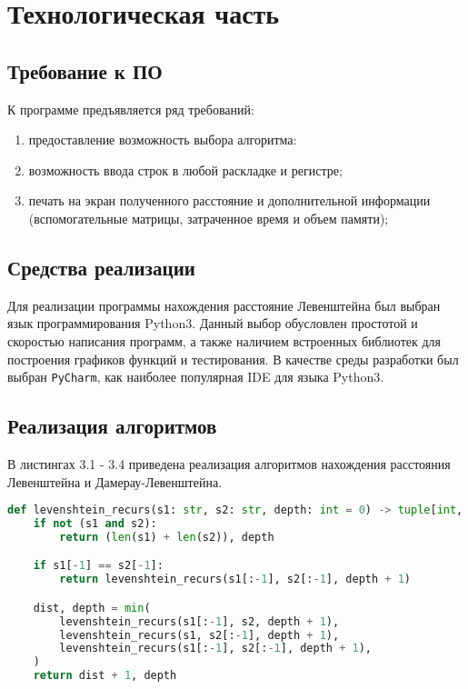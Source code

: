 \chapter{Технологическая часть}

\section{Требование к ПО}
К программе предъявляется ряд требований:
\begin{enumerate}
    \item предоставление возможность выбора алгоритма:
	\item возможность ввода строк в любой раскладке и регистре;
	\item печать на экран полученного расстояние и дополнительной информации (вспомогательные матрицы, затраченное время и объем памяти);
\end{enumerate}

\section{Средства реализации}
Для реализации программы нахождения расстояние Левенштейна был выбран язык программирования Python3\cite{python}. Данный выбор обусловлен простотой и скоростью написания программ, а также наличием встроенных библиотек для построения графиков функций и тестирования. В качестве среды разработки был выбран \texttt{PyCharm}\cite{pycharm}, как наиболее популярная IDE для языка Python3. 

\section{Реализация алгоритмов}

В листингах 3.1 - 3.4 приведена реализация алгоритмов нахождения расстояния Левенштейна и Дамерау-Левенштейна.

\begin{lstlisting}[label=LevRec,caption=Функция нахождения расстояния Левенштейна рекурсивно,language=python]
def levenshtein_recurs(s1: str, s2: str, depth: int = 0) -> tuple[int, int]:
    if not (s1 and s2):
        return (len(s1) + len(s2)), depth

    if s1[-1] == s2[-1]:
        return levenshtein_recurs(s1[:-1], s2[:-1], depth + 1)

    dist, depth = min(
        levenshtein_recurs(s1[:-1], s2, depth + 1),
        levenshtein_recurs(s1, s2[:-1], depth + 1),
        levenshtein_recurs(s1[:-1], s2[:-1], depth + 1),
    )
    return dist + 1, depth
\end{lstlisting}

